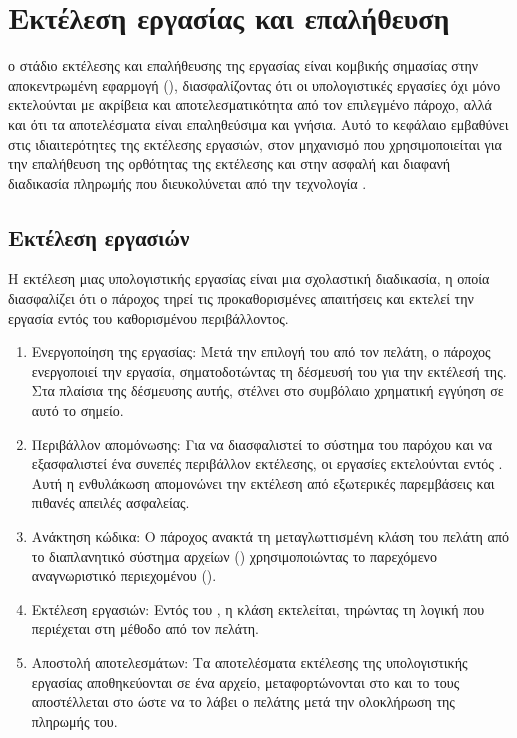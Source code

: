 \chapter{Εκτέλεση εργασίας και επαλήθευση}
 ο στάδιο εκτέλεσης και επαλήθευσης της εργασίας είναι κομβικής σημασίας στην αποκεντρωμένη εφαρμογή (), διασφαλίζοντας ότι οι υπολογιστικές εργασίες όχι μόνο εκτελούνται με ακρίβεια και αποτελεσματικότητα από τον επιλεγμένο πάροχο, αλλά και ότι τα αποτελέσματα είναι επαληθεύσιμα και γνήσια. Αυτό το κεφάλαιο εμβαθύνει στις ιδιαιτερότητες της εκτέλεσης εργασιών, στον μηχανισμό που χρησιμοποιείται για την επαλήθευση της ορθότητας της εκτέλεσης και στην ασφαλή και διαφανή διαδικασία πληρωμής που διευκολύνεται από την τεχνολογία .


\section{Εκτέλεση εργασιών}
Η εκτέλεση μιας υπολογιστικής εργασίας είναι μια σχολαστική διαδικασία, η οποία διασφαλίζει ότι ο πάροχος τηρεί τις προκαθορισμένες απαιτήσεις και εκτελεί την εργασία εντός του καθορισμένου περιβάλλοντος.
\begin{enumerate}
    \item Ενεργοποίηση της εργασίας: Μετά την επιλογή του από τον πελάτη, ο πάροχος ενεργοποιεί την εργασία, σηματοδοτώντας τη δέσμευσή του για την εκτέλεσή της. Στα πλαίσια της δέσμευσης αυτής, στέλνει στο συμβόλαιο χρηματική εγγύηση σε αυτό το σημείο.
    \item Περιβάλλον απομόνωσης: Για να διασφαλιστεί το σύστημα του παρόχου και να εξασφαλιστεί ένα συνεπές περιβάλλον εκτέλεσης, οι εργασίες εκτελούνται εντός . Αυτή η ενθυλάκωση απομονώνει την εκτέλεση από εξωτερικές παρεμβάσεις και πιθανές απειλές ασφαλείας.
    \item Ανάκτηση κώδικα: Ο πάροχος ανακτά τη μεταγλωττισμένη κλάση  του πελάτη από το διαπλανητικό σύστημα αρχείων () χρησιμοποιώντας το παρεχόμενο αναγνωριστικό περιεχομένου ().
    \item Εκτέλεση εργασιών: Εντός του , η κλάση  εκτελείται, τηρώντας τη λογική που περιέχεται στη μέθοδο \textit{} από τον πελάτη.
    \item Αποστολή αποτελεσμάτων: Τα αποτελέσματα εκτέλεσης της υπολογιστικής εργασίας αποθηκεύονται σε ένα αρχείο, μεταφορτώνονται στο  και το  τους αποστέλλεται στο  ώστε να το λάβει ο πελάτης μετά την ολοκλήρωση της πληρωμής του.
\end{enumerate}

